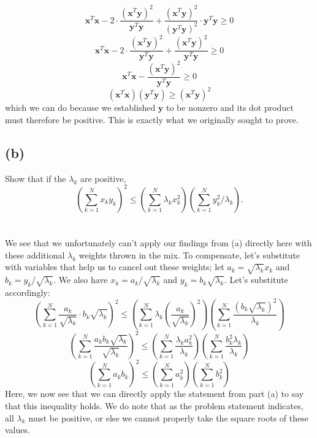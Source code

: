 \documentclass{article}
\begin{document}
{\[\]
\[
  \mathbf{x}^T\mathbf{x} - 2 \cdot \frac{(\mathbf{x}^T \mathbf{y})^2}{\mathbf{y}^T \mathbf{y}} + \frac{(\mathbf{x}^T \mathbf{y})^2}{(\mathbf{y}^T \mathbf{y})^2} \cdot \mathbf{y}^T \mathbf{y} \geq 0
\]
\[
  \mathbf{x}^T\mathbf{x} - 2 \cdot \frac{(\mathbf{x}^T \mathbf{y})^2}{\mathbf{y}^T \mathbf{y}} + \frac{(\mathbf{x}^T \mathbf{y})^2}{\mathbf{y}^T \mathbf{y}} \geq 0
\]
\[
  \mathbf{x}^T\mathbf{x} - \frac{(\mathbf{x}^T \mathbf{y})^2}{\mathbf{y}^T \mathbf{y}} \geq 0
\]
\[
  (\mathbf{x}^T\mathbf{x})({\mathbf{y}^T \mathbf{y}}) \geq (\mathbf{x}^T \mathbf{y})^2
\]
which we can do because we established \(\mathbf{y}\) to be nonzero and its dot product must therefore be positive. This is exactly what we originally sought to prove.

\subsection*{(b)}
Show that if the \(\lambda_k\) are positive,
\[
  \left(\sum_{k=1}^{N} x_k y_k \right)^2 \leq \left( \sum_{k=1}^{N} \lambda_k x^2_k \right) \left( \sum_{k=1}^{N} y^2_k / \lambda_k \right).
\] \\ \\
We see that we unfortunately can't apply our findings from (a) directly here with these additional \(\lambda_k\) weights thrown in the mix. To compensate, let's substitute with variables that help us to cancel out these weights; let \(a_k = \sqrt{\lambda_k} x_k\) and \(b_k = y_k / \sqrt{\lambda_k}\). We also have \(x_k = a_k / \sqrt{\lambda_k}\) and \(y_k = b_k \sqrt{\lambda_k}\). Let's substitute accordingly:
\[
  \left(\sum_{k=1}^{N} \frac{a_k}{\sqrt{\lambda_k}} \cdot b_k \sqrt{\lambda_k} \right)^2 \leq \left( \sum_{k=1}^{N} \lambda_k (\frac{a_k}{\sqrt{\lambda_k}})^2 \right) \left( \sum_{k=1}^{N} \frac{(b_k \sqrt{\lambda_k})^2}{\lambda_k} \right)
\]
\[
  \left(\sum_{k=1}^{N} \frac{a_k b_k \sqrt{\lambda_k}}{\sqrt{\lambda_k}} \right)^2 \leq \left( \sum_{k=1}^{N} \frac{\lambda_k a_k^2}{\lambda_k} \right) \left( \sum_{k=1}^{N} \frac{b_k^2 \lambda_k}{\lambda_k} \right)
\]
\[
  \left(\sum_{k=1}^{N} a_k b_k \right)^2 \leq \left( \sum_{k=1}^{N} a_k^2 \right) \left( \sum_{k=1}^{N} b_k^2 \right)
\]
Here, we now see that we can directly apply the statement from part (a) to say that this inequality holds. We do note that as the problem statement indicates, all \(\lambda_k\) must be positive, or else we cannot properly take the square roots of these values. 

}
\end{document}

